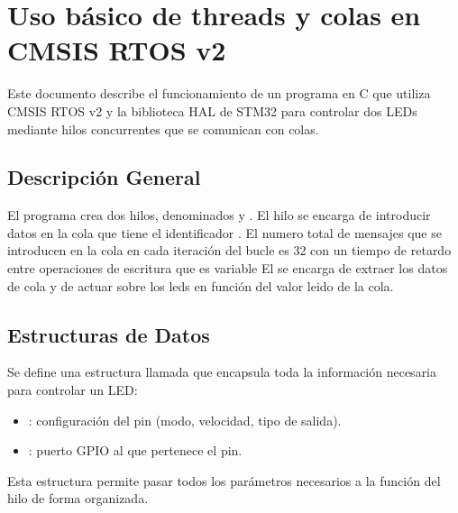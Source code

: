 \documentclass[letterpaper,10pt,english]{sphinxmanual}
\begin{document}
\sphinxstepscope


\chapter{Uso básico de threads y colas en CMSIS RTOS v2}
\label{\detokenize{ejemplothreads-queues:uso-basico-de-threads-y-colas-en-cmsis-rtos-v2}}\label{\detokenize{ejemplothreads-queues::doc}}
\sphinxAtStartPar
Este documento describe el funcionamiento de un programa en C que utiliza CMSIS RTOS v2 y la biblioteca HAL de STM32 para controlar dos LEDs mediante hilos concurrentes que se comunican con colas.


\section{Descripción General}
\label{\detokenize{ejemplothreads-queues:descripcion-general}}
\sphinxAtStartPar
El programa crea dos hilos, denominados  y . El hilo  se encarga de introducir datos en la cola que tiene el identificador .
El numero total de mensajes que se introducen en la cola en cada iteración del bucle  es 32 con un tiempo de retardo entre operaciones de escritura que es variable
El  se encarga de extraer los datos de cola y de actuar sobre los leds en función del valor leido de la cola.


\section{Estructuras de Datos}
\label{\detokenize{ejemplothreads-queues:estructuras-de-datos}}
\sphinxAtStartPar
Se define una estructura llamada  que encapsula toda la información necesaria para controlar un LED:
\begin{itemize}
\item {} 
\sphinxAtStartPar
{}: configuración del pin (modo, velocidad, tipo de salida).

\item {} 
\sphinxAtStartPar
{}: puerto GPIO al que pertenece el pin.

\end{itemize}

\sphinxAtStartPar
Esta estructura permite pasar todos los parámetros necesarios a la función del hilo de forma organizada.
\end{document}

